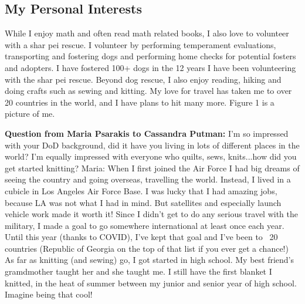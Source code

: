 \subsection{My Personal Interests}
While I enjoy math and often read math related books, I also love to volunteer with a shar pei rescue.  I volunteer by performing temperament evaluations, transporting and fostering dogs and  performing home checks for potential fosters and adopters.  I have fostered 100+ dogs in the 12 years I have been volunteering with the shar pei rescue.  Beyond dog rescue, I also enjoy reading, hiking and doing crafts such as sewing and kitting. My love for travel has taken me to over 20 countries in the world, and I have plans to hit many more.  Figure 1 is a picture of me.

\textbf{Question from Maria Psarakis to Cassandra Putman:} I'm so impressed with your DoD background, did it have you living in lots of different places in the world? I'm equally impressed with everyone who quilts, sews, knits...how did you get started knitting? 
Maria: When I first joined the Air Force I had big dreams of seeing the country and going overseas, travelling the world.  Instead, I lived in a cubicle in Los Angeles Air Force Base. I was lucky that I had amazing jobs, because LA was not what I had in mind.  But satellites and especially launch vehicle work made it worth it!  Since I didn't get to do any serious travel with the military, I made a goal to go somewhere international at least once each year.  Until this year (thanks to COVID), I've kept that goal and I've been to ~20 countries (Republic of Georgia on the top of that list if you ever get a chance!) 
As far as knitting (and sewing) go, I got started in high school. My best friend's gramdmother taught her and she taught me. I still have the first blanket I knitted, in the heat of summer between my junior and senior year of high school. Imagine being that cool! 
